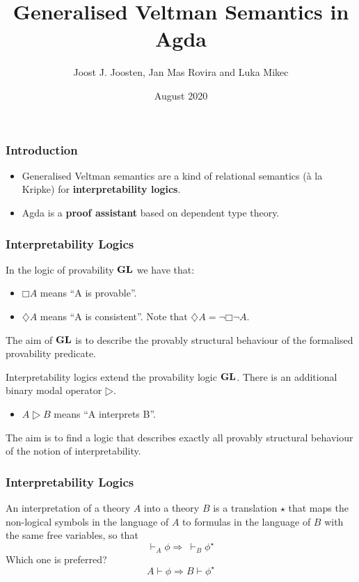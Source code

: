 \documentclass{beamer}
\title{Generalised Veltman Semantics in Agda}
\author{Joost J. Joosten, Jan Mas Rovira and Luka Mikec}
\institute{University of Barcelona}
\date{August 2020}
\newcommand{\gl}{\ensuremath{\textup{\textbf{GL}}}\xspace}
\begin{document}
\frame{\titlepage}

\begin{frame}
  \frametitle{Introduction}
  \begin{itemize}
  \item Generalised Veltman semantics are a kind of relational semantics (à la
    Kripke) for \textbf{interpretability logics}. \break \pause
    \item Agda is a \textbf{proof assistant} based on dependent type theory.
  \end{itemize}
\end{frame}

\begin{frame}
  \frametitle{Interpretability Logics}
  In the logic of provability \gl we have that:
  \begin{itemize}
    \item $□A$ means ``A is provable''.
    \item $♢A$ means ``A is consistent''. Note that $♢A=¬□¬A$.
  \end{itemize}
  The aim of \gl is to describe the provably structural behaviour of the
  formalised provability predicate.

  \pause \vspace{0.5cm}

  Interpretability logics extend the provability logic \gl. There is an
  additional binary modal operator $▷$.
  \begin{itemize}
  \item $A▷B$ means ``A interprets B''.
  \end{itemize}
  The aim is to find a logic that describes exactly all provably structural
  behaviour of the notion of interpretability.
\end{frame}

\begin{frame}
  \frametitle{Interpretability Logics}
  An interpretation of a theory $A$ into a theory $B$ is a translation $⋆$ that
  maps the non-logical symbols in the language of $A$ to formulas in the
  language of $B$ with the same free variables, so that
  \[⊢_Aϕ⇒\ ⊢_Bϕ^⋆\]
  Which one is preferred?
  \[A⊢ϕ⇒ B⊢ϕ^⋆\]
\end{frame}
\end{document}
